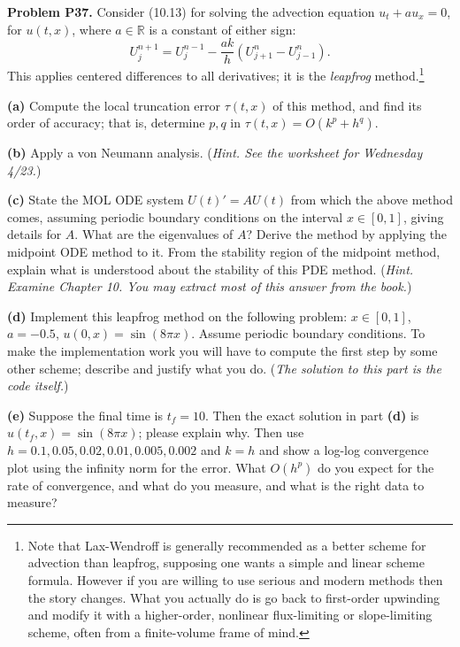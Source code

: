 \documentclass[12pt]{amsart}
\newcommand{\RR}{\mathbb{R}}
\newcommand{\prob}[1]{\bigskip\noindent\textbf{#1}\quad }
\newcommand{\epart}[1]{\medskip\noindent\textbf{(#1)}\quad }
\begin{document}
\prob{Problem P37.}  Consider (10.13) for solving the advection equation $u_t + a u_x = 0$, for $u(t,x)$, where $a\in\RR$ is a constant of either sign:
    $$U_j^{n+1} = U_j^{n-1} - \frac{ak}{h}(U_{j+1}^n - U_{j-1}^n).$$
This applies centered differences to all derivatives; it is the \emph{leapfrog} method.\footnote{Note that Lax-Wendroff is generally recommended as a better scheme for advection than leapfrog, supposing one wants a simple and linear scheme formula.  However if you are willing to use serious and modern methods then the story changes.  What you actually do is go back to first-order upwinding and modify it with a higher-order, nonlinear flux-limiting or slope-limiting scheme, often from a finite-volume frame of mind.}

\epart{a} Compute the local truncation error $\tau(t,x)$ of this method, and find its order of accuracy; that is, determine $p,q$ in $\tau(t,x) = O(k^p + h^q)$.

\epart{b} Apply a von Neumann analysis.  (\emph{Hint.  See the worksheet for Wednesday 4/23.})

\epart{c} State the MOL ODE system $U(t)' = A U(t)$ from which the above method comes, assuming periodic boundary conditions on the interval $x\in[0,1]$, giving details for $A$.  What are the eigenvalues of $A$?  Derive the method by applying the midpoint ODE method to it.  From the stability region of the midpoint method, explain what is understood about the stability of this PDE method.  (\emph{Hint. Examine Chapter 10.  You may extract most of this answer from the book.})

\epart{d} Implement this leapfrog method on the following problem:  $x\in[0,1]$, $a = -0.5$, $u(0,x)=\sin(8\pi x)$.  Assume periodic boundary conditions.  To make the implementation work you will have to compute the first step by some other scheme; describe and justify what you do.  (\emph{The solution to this part is the code itself.})

\epart{e} Suppose the final time is $t_f=10$.  Then the exact solution in part \textbf{(d)} is $u(t_f,x) = \sin(8\pi x)$; please explain why.  Then use $h=0.1,0.05,0.02,0.01,0.005,0.002$ and $k=h$ and show a log-log convergence plot using the infinity norm for the error.  What $O(h^p)$ do you expect for the rate of convergence, and what do you measure, and what is the right data to measure?
\end{document}
